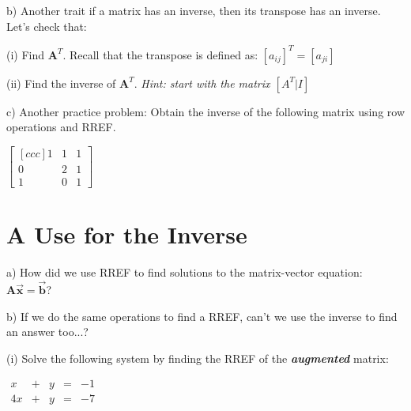 \documentclass{article}
\begin{document}
\begin{flushleft}
b) Another trait if a matrix has an inverse, then its transpose has an inverse. Let's check that:

\vspace{0.2in}

(i) Find $\textbf{A}^T$. Recall that the transpose is defined as: $[a_{ij}]^T = [a_{ji}]$

\vspace{1.5in}

(ii) Find the inverse of $\textbf{A}^T$. \textit{Hint: start with the matrix  $\left[ A^T | I \right] $ }

\vspace{2in}

c) Another practice problem: Obtain the inverse of the following matrix using row operations and RREF.

\begin{center}
$\begin{bmatrix}[ccc]
1 & 1 & 1 \\
0 & 2 & 1 \\
1 & 0 & 1 
\end{bmatrix}$
\end{center}

\newpage

\section{A Use for the Inverse}

a) How did we use RREF to find solutions to the matrix-vector equation: $\textbf{A} \vec{\textbf{x}} = \vec{\textbf{b}}$?

\vspace{1in}

b) If we do the same operations to find a RREF, can't we use the inverse to find an answer too...?

\vspace{0.2in}

(i) Solve the following system by finding the RREF of the \textbf{\textit{augmented}} matrix:

\begin{center}
$\begin{array}{rrrrr}
x & + & y & = & -1\\
4x & + & y & = & -7
\end{array}
$ \\ \end{center}

\vspace{2in}


\end{flushleft}
\end{document}
